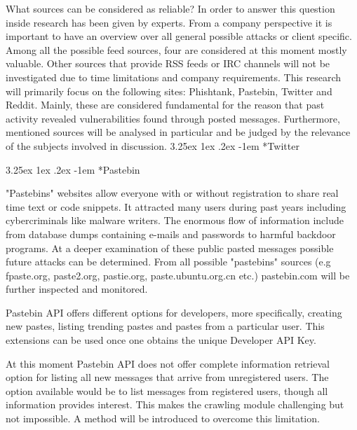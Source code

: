 \documentclass[12pt]{article}
\makeatletter
\newcounter{subsubsubsection}[subsubsection]
\renewcommand\paragraph{\@startsection{paragraph}{5}{\z@}%
  {3.25ex \@plus1ex \@minus.2ex}%
  {-1em}%
  {\normalfont\normalsize\bfseries}}
\makeatother
\begin{document}
What sources can be considered as reliable? In order to answer this question inside research has been given by experts. From a company perspective it is important to have an overview over all general possible attacks or client specific. Among all the possible feed sources, four are considered at this moment mostly valuable. Other sources that provide RSS feeds or IRC channels will not be investigated due to time limitations and company requirements. This research will primarily focus on the following sites: Phishtank, Pastebin, Twitter and Reddit. Mainly, these are considered fundamental for the reason that past activity revealed vulnerabilities found through posted messages.  Furthermore, mentioned sources will be analysed in particular and be judged by the relevance of the subjects involved in discussion. 
\paragraph*{Twitter}
\paragraph*{Pastebin}
\hfill \break
"Pastebins" websites \cite{fpaste} \cite{pastebin} allow everyone with or without registration to share real time text or code snippets. It attracted many users during past years including cybercriminals like malware writers\cite{pastebin-magazine}. The enormous flow of information include from database dumps containing e-mails and passwords to harmful backdoor programs. At a deeper examination of these public pasted messages possible future attacks can be determined. From all possible "pastebins" sources (e.g fpaste.org, paste2.org, pastie.org\cite{pastebin-pastie}, paste.ubuntu.org.cn \cite{pastebin-ubuntu} etc.) pastebin.com \cite{pastebin} will be further inspected and monitored.

Pastebin API offers different options for developers, more specifically, creating new pastes, listing trending pastes and pastes from a particular user. This extensions can be used once one obtains the unique Developer API Key. 

At this moment Pastebin API \cite{pastebin} does not offer complete information retrieval option for listing all new messages that arrive from unregistered users. The option available would be to list messages from registered users, though all information provides interest. This makes the crawling module challenging but not impossible. A method will be introduced to overcome this limitation. 
\end{document}
